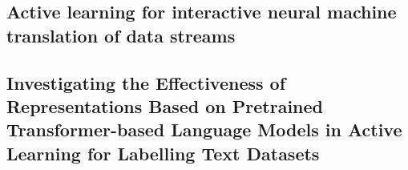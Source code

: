 
\subsection{Active learning for interactive neural machine translation of data streams}
\label{active-learning-interactive}
  

\subsection{Investigating the Effectiveness of Representations Based on Pretrained 
Transformer-based Language Models in Active Learning for Labelling Text Datasets}
\label{investigating-effectiveness}

